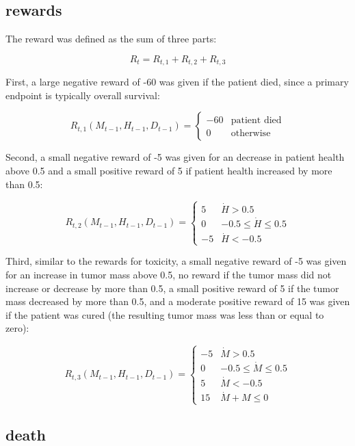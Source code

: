 \documentclass[12pt]{article}
\begin{document}


\subsection{rewards} %
\label{sub:}

The reward was defined as the sum of three parts: 

\[
R_{t} = R_{t, 1} + R_{t, 2} + R_{t, 3}
\]

First, a large negative reward of -60 was given if the patient died, since a primary endpoint is typically overall survival:

\[
R_{t, 1}(M_{t-1}, H_{t-1}, D_{t-1}) = 
\begin{cases}
  -60 & \text{patient died} \\
  0 & \text{otherwise}
\end{cases}
\]

Second, a small negative reward of -5 was given for an decrease in patient health above 0.5 and a small positive reward of 5 if patient health increased by more than 0.5:

\[
R_{t, 2}(M_{t-1}, H_{t-1}, D_{t-1}) =  
\begin{cases}
  5 & \dot{H} > 0.5 \\
  0 & -0.5 \leq \dot{H} \leq 0.5 \\
  -5 & \dot{H} < -0.5
\end{cases}
\]

Third, similar to the rewards for toxicity, a small negative reward of -5 was given for an increase in tumor mass above 0.5, no reward if the tumor mass did not increase or decrease by more than 0.5, a small positive reward of 5 if the tumor mass decreased by more than 0.5, and a moderate positive reward of 15 was given if the patient was cured (the resulting tumor mass was less than or equal to zero):

\[
R_{t, 3}(M_{t-1}, H_{t-1}, D_{t-1}) = 
\begin{cases}
  -5 & \dot{M} > 0.5 \\
  0 & -0.5 \leq \dot{M} \leq 0.5 \\
  5 & \dot{M} < -0.5 \\
  15 & \dot{M} + M \leq 0
\end{cases}
\]


\subsection{death} %
\label{sub:death}
\end{document}
